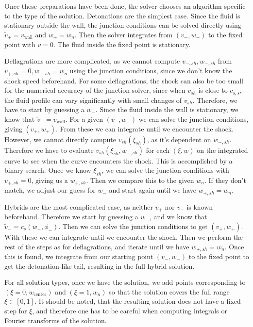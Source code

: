 Once these preparations have been done,
the solver chooses an algorithm specific to the type of the solution.
Detonations are the simplest case.
Since the fluid is stationary outside the wall,
the junction conditions can be solved directly using
$\tilde{v}_+ = v_\text{wall}$ and $w_+ = w_n$.
Then the solver integrates from $(v_-, w_-)$ to the fixed point with $v=0$.
The fluid inside the fixed point is stationary.

Deflagrations are more complicated,
as we cannot compute $v_{-,sh}, w_{-,sh}$ from $v_{+,sh}=0, w_{+,sh}=w_n$ using the junction conditions,
since we don't know the shock speed beforehand.
For some deflagrations, the shock can also be too small for the numerical accuracy of the junction solver,
since when $v_{sh}$ is close to $c_{s,s}$, the fluid profile can vary significantly with small changes of $v_{sh}$.
Therefore, we have to start by guessing a $w_-$.
Since the fluid inside the wall is stationary, we know that $\tilde{v}_- = v_{\text{wall}}$.
For a given $(v_-, w_-)$ we can solve the junction conditions, giving $(v_+, w_+)$.
From these we can integrate until we encounter the shock.
However, we cannot directly compute $v_{sh}(\xi_{sh})$, as it's dependent on $w_{-,sh}$.
Therefore we have to evaluate $v_{sh}(\xi_{sh}, w_{-,sh})$ for each $(\xi, w)$ on the integrated curve to see
when the curve encounters the shock.
This is accomplished by a binary search.
Once we know $\xi_{sh}$, we can solve the junction conditions with $v_{+,sh} = 0$, giving us a $w_{+,sh}$.
Then we compare this to the given $w_n$.
If they don't match, we adjust our guess for $w_-$ and start again until we have $w_{+,sh} = w_n$.

Hybrids are the most complicated case, as neither $v_+$ nor $v_-$ is known beforehand.
Therefore we start by guessing a $w_-$, and we know that $\tilde{v}_- = c_s(w_-, \phi_-)$.
Then we can solve the junction conditions to get $(v_+, w_+)$.
With these we can integrate until we encounter the shock.
Then we perform the rest of the steps as for deflagrations, and iterate until we have $w_{+,sh} = w_n$.
Once this is found, we integrate from our starting point $(v_-, w_-)$ to the fixed point to get the detonation-like tail,
resulting in the full hybrid solution.

For all solution types, once we have the solution,
we add points corresponding to $(\xi=0, w_\text{center})$ and $(\xi=1, w_n)$
so that the solution covers the full range $\xi \in [0, 1]$.
It should be noted, that the resulting solution does not have a fixed step for $\xi$,
and therefore one has to be careful when computing integrals or Fourier transforms of the solution.

